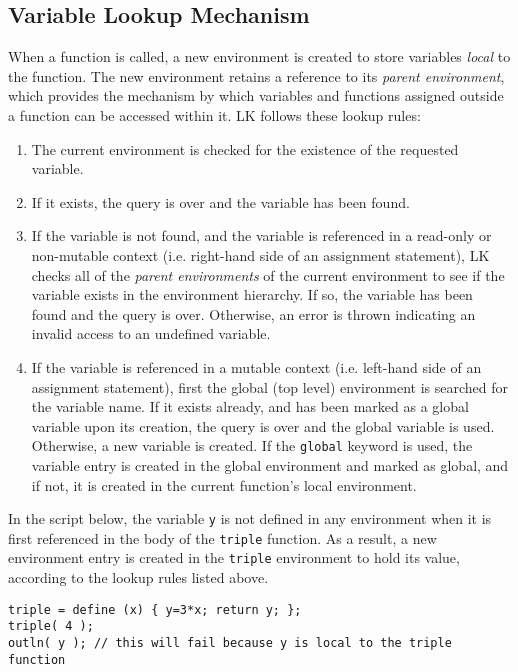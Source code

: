 \documentclass{article}
\begin{document}
\subsection{Variable Lookup Mechanism}
When a function is called, a new environment is created to store variables \emph{local} to the function.  The new environment retains a reference to its \emph{parent environment}, which provides the mechanism by which variables and functions assigned outside a function can be accessed within it.  LK follows these lookup rules:

\begin{enumerate}
\item The current environment is checked for the existence of the requested variable.
\item If it exists, the query is over and the variable has been found.
\item If the variable is not found, and the variable is referenced in a read-only or non-mutable context (i.e. right-hand side of an assignment statement), LK checks all of the \emph{parent environments} of the current environment to see if the variable exists in the environment hierarchy.  If so, the variable has been found and the query is over. Otherwise, an error is thrown indicating an invalid access to an undefined variable.
\item If the variable is referenced in a mutable context (i.e. left-hand side of an assignment statement), first the global (top level) environment is searched for the variable name.  If it exists already, and has been marked as a global variable upon its creation, the query is over and the global variable is used.  Otherwise, a new variable is created.  If the \texttt{global} keyword is used, the variable entry is created in the global environment and marked as global, and if not, it is created in the current function's local environment.
\end{enumerate}

In the script below, the variable \texttt{y} is not defined in any environment when it is first referenced in the body of the \texttt{triple} function.  As a result, a new environment entry is created in the \texttt{triple} environment to hold its value, according to the lookup rules listed above.

\begin{verbatim}
triple = define (x) { y=3*x; return y; };
triple( 4 );
outln( y ); // this will fail because y is local to the triple function
\end{verbatim}
\end{document}
